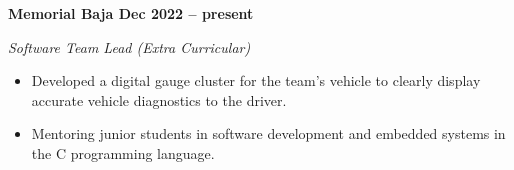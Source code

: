 \vspace{0.1cm}
\textbf{Memorial Baja \hfill Dec 2022 -- present} \par
\textit{Software Team Lead (Extra Curricular)} \par
\begin{itemize}
    \item Developed a digital gauge cluster for the team's vehicle to clearly display accurate vehicle diagnostics to the driver.
    \item Mentoring junior students in software development and embedded systems in the C programming language.
\end{itemize} \par